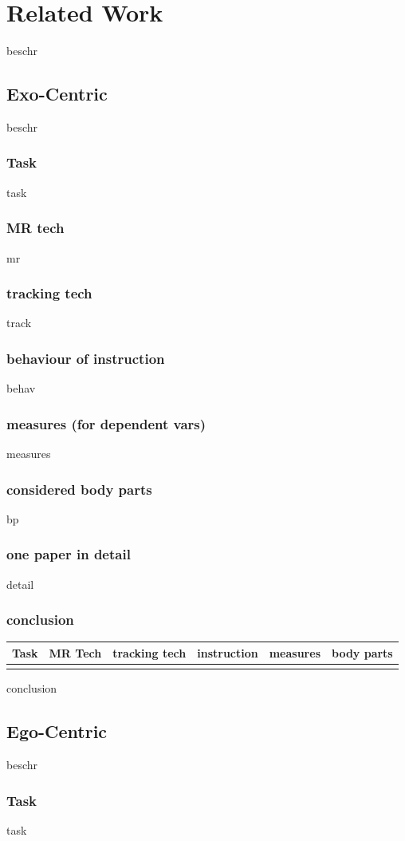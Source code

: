 \chapter{Related Work}
beschr
\section{Exo-Centric}
beschr
\subsection{Task}
task
\subsection{MR tech}
mr
\subsection{tracking tech}
track
\subsection{behaviour of instruction}
behav
\subsection{measures (for dependent vars)}
measures
\subsection{considered body parts}
bp
\subsection{one paper in detail}
detail
\subsection{conclusion}
\begin{table}[]
	\begin{tabular}{|l|l|l|l|l|l|}
		\hline
		Task & MR Tech & tracking tech & instruction & measures & body parts  \\ \hline
		&  &  &  &  &  \\ \hline
	\end{tabular}
\end{table}
conclusion
\section{Ego-Centric}
beschr
\subsection{Task}
task
